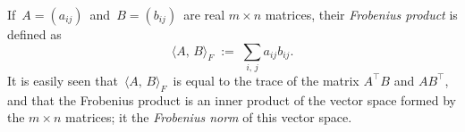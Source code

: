 \documentclass[12pt]{article}
\theoremstyle{definition}
\begin{document}
If\, $A = (a_{ij})$\, and\, $B = (b_{ij})$\, are real $m\!\times\!n$ matrices, their {\em Frobenius product} is defined as 
$$\langle A,\,B \rangle_F \;:=\; \sum_{i,\,j}a_{ij}b_{ij}.$$
It is easily seen that\, $\langle A,\,B \rangle_F$\, is equal to the trace of the matrix $A^\intercal B$ and $AB^\intercal $, and that the Frobenius product is an inner product of the vector space formed by the $m\!\times\!n$ matrices; it  the {\em Frobenius norm} of this vector space.
\end{document}
